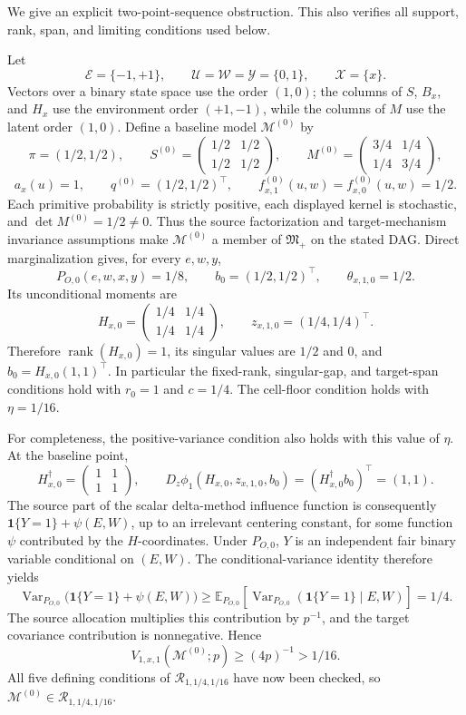We give an explicit two-point-sequence obstruction.  This also verifies all support, rank, span, and limiting conditions used below.

Let
\[
\mathcal E=\{-1,+1\},\qquad
\mathcal U=\mathcal W=\mathcal Y=\{0,1\},\qquad
\mathcal X=\{x\}.
\]
Vectors over a binary state space use the order \((1,0)\); the columns of \(S\), \(B_x\), and \(H_x\) use the environment order \((+1,-1)\), while the columns of \(M\) use the latent order \((1,0)\).  Define a baseline model \(\mathcal M^{(0)}\) by
\[
\pi=(1/2,1/2),\qquad
S^{(0)}=
\begin{pmatrix}1/2&1/2\\1/2&1/2\end{pmatrix},\qquad
M^{(0)}=
\begin{pmatrix}3/4&1/4\\1/4&3/4\end{pmatrix},
\]
\[
a_x(u)=1,\qquad q^{(0)}=(1/2,1/2)^{\top},\qquad
f^{(0)}_{x,1}(u,w)=f^{(0)}_{x,0}(u,w)=1/2.
\]
Each primitive probability is strictly positive, each displayed kernel is stochastic, and
\(\det M^{(0)}=1/2\ne0\).  Thus the source factorization and target-mechanism invariance assumptions make \(\mathcal M^{(0)}\) a member of \(\mathfrak M_{+}\) on the stated DAG.  Direct marginalization gives, for every \(e,w,y\),
\[
P_{O,0}(e,w,x,y)=1/8,\qquad
b_0=(1/2,1/2)^{\top},\qquad
\theta_{x,1,0}=1/2.
\]
Its unconditional moments are
\[
H_{x,0}=
\begin{pmatrix}1/4&1/4\\1/4&1/4\end{pmatrix},\qquad
z_{x,1,0}=(1/4,1/4)^{\top}.
\]
Therefore \(\operatorname{rank}(H_{x,0})=1\), its singular values are \(1/2\) and \(0\), and \(b_0=H_{x,0}(1,1)^{\top}\).  In particular the fixed-rank, singular-gap, and target-span conditions hold with \(r_0=1\) and \(c=1/4\).  The cell-floor condition holds with \(\eta=1/16\).

For completeness, the positive-variance condition also holds with this value of \(\eta\).  At the baseline point,
\[
H_{x,0}^{\dagger}=
\begin{pmatrix}1&1\\1&1\end{pmatrix},\qquad
D_z\phi_1(H_{x,0},z_{x,1,0},b_0)=
(H_{x,0}^{\dagger}b_0)^{\top}=(1,1).
\]
The source part of the scalar delta-method influence function is consequently
\(\mathbf 1\{Y=1\}+\psi(E,W)\), up to an irrelevant centering constant, for some function \(\psi\) contributed by the \(H\)-coordinates.  Under \(P_{O,0}\), \(Y\) is an independent fair binary variable conditional on \((E,W)\).  The conditional-variance identity therefore yields
\[
\operatorname{Var}_{P_{O,0}}
\bigl(\mathbf 1\{Y=1\}+\psi(E,W)\bigr)
\ge
\mathbb E_{P_{O,0}}\!\left[
\operatorname{Var}_{P_{O,0}}(\mathbf 1\{Y=1\}\mid E,W)
\right]=1/4.
\]
The source allocation multiplies this contribution by \(p^{-1}\), and the target covariance contribution is nonnegative.  Hence
\[
V_{1,x,1}(\mathcal M^{(0)};p)\ge(4p)^{-1}>1/16.
\]
All five defining conditions of \(\mathcal R_{1,1/4,1/16}\) have now been checked, so \(\mathcal M^{(0)}\in\mathcal R_{1,1/4,1/16}\).

